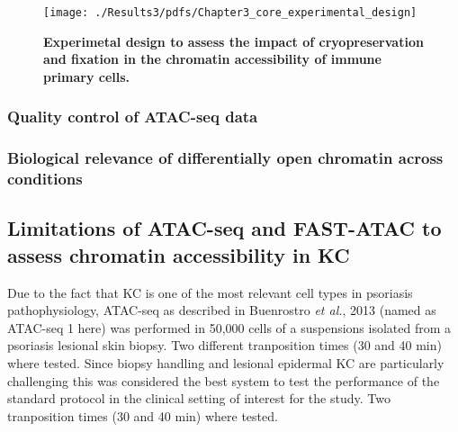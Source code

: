 \begin{figure}[H]
\centering
\texttt{[image: ./Results3/pdfs/Chapter3\_core\_experimental\_design]}
\caption[Experimetal design to assess the impact of cryopreservation and fixation in the chromatin accessibility of immune primary cells.]{\textbf{Experimetal design to assess the impact of cryopreservation and fixation in the chromatin accessibility of immune primary cells.}}
\label{figure:Core_experimental_design}
\end{figure}




\subsubsection{Quality control of ATAC-seq data}
\subsubsection{Biological relevance of differentially open chromatin across conditions}




\subsection{Limitations of ATAC-seq and FAST-ATAC to assess chromatin accessibility in KC}

Due to the fact that KC is one of the most relevant cell types in psoriasis pathophysiology, ATAC-seq as described in Buenrostro \textit{et al.}, 2013 (named as ATAC-seq 1 here) was performed in 50,000 cells of a suspensions isolated from a psoriasis lesional skin biopsy. Two different tranposition times (30 and 40 min) where tested. Since biopsy handling and lesional epidermal KC are particularly challenging this was considered the best system to test the performance of the standard protocol in the clinical setting of interest for the study. Two tranposition times (30 and 40 min) where tested.


